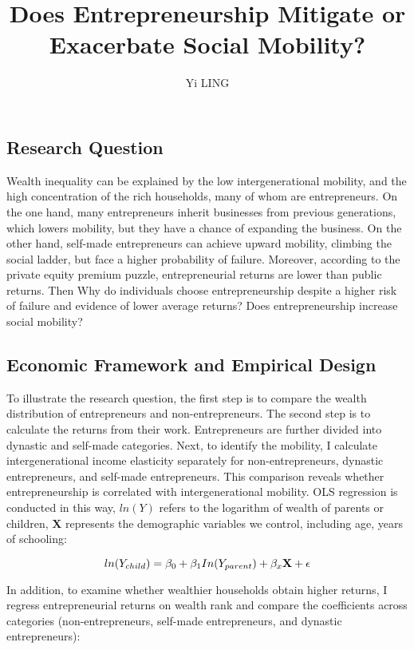 \documentclass[a4paper,12pt]{article}
\title{Does Entrepreneurship Mitigate or Exacerbate Social Mobility? }
\author{Yi LING}
\begin{document}
\doublespacing
\maketitle

\subsection{Research Question}

Wealth inequality can be explained by the low intergenerational mobility, and the high concentration of the rich households, many of whom are entrepreneurs.  On the one hand, many entrepreneurs inherit businesses from previous generations, which lowers mobility, but they have a chance of expanding the business. On the other hand, self-made entrepreneurs can achieve upward mobility, climbing the social ladder, but face a higher probability of failure. Moreover, according to the private equity premium puzzle, entrepreneurial returns are lower than public returns. Then Why do individuals choose entrepreneurship despite a higher risk of failure and evidence of lower average returns? Does entrepreneurship increase social mobility?

\subsection{Economic Framework and Empirical Design}

To illustrate the research question, the first step is to compare the wealth distribution of entrepreneurs and non-entrepreneurs. The second step is to calculate the returns from their work. Entrepreneurs are further divided into dynastic and self-made categories. Next, to identify the mobility, I calculate intergenerational income elasticity separately for non-entrepreneurs, dynastic entrepreneurs, and self-made entrepreneurs. This comparison reveals whether entrepreneurship is correlated with intergenerational mobility. OLS regression is conducted in this way, $ln(Y)$ refers to the logarithm of wealth of parents or children, $\textbf{X}$ represents the demographic variables we control, including age, years of schooling:

\begin{equation}
ln(Y_{child})=\beta_0+\beta_1 In(Y_{parent})+\beta_x \textbf{X}+\epsilon  \\
\end{equation}

In addition, to examine whether wealthier households obtain higher returns, I regress entrepreneurial returns on wealth rank and compare the coefficients across categories (non-entrepreneurs, self-made entrepreneurs, and dynastic entrepreneurs):
\end{document}

